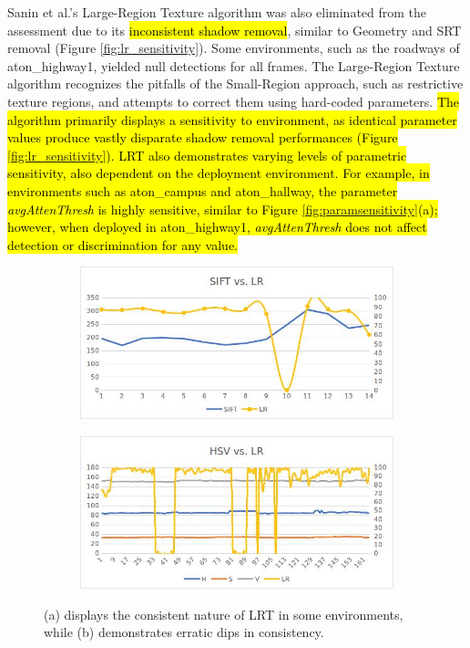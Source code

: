 \documentclass[12pt]{report}
\begin{document}
Sanin et al.'s Large-Region Texture algorithm was also eliminated from the assessment due to its \hl{inconsistent shadow removal}, similar to Geometry and SRT removal (Figure \ref{fig:lr_sensitivity}). Some environments, such as the roadways of aton\_highway1, yielded null detections for all frames. The Large-Region Texture algorithm recognizes the pitfalls of the Small-Region approach, such as restrictive texture regions, and attempts to correct them using hard-coded parameters. \hl{The algorithm primarily displays a sensitivity to environment, as identical parameter values produce vastly disparate shadow removal performances (Figure \ref{fig:lr_sensitivity}). LRT also demonstrates varying levels of parametric sensitivity, also dependent on the deployment environment. For example, in environments such as aton\_campus and aton\_hallway, the parameter \textit{avgAttenThresh} is highly sensitive, similar to Figure \ref{fig:paramsensitivity}(a); however, when deployed in aton\_highway1, \textit{avgAttenThresh} does not affect detection or discrimination for any value.}

\begin{figure}
\centering
\begin{subfigure}{.8\linewidth}
  \centering
  \includegraphics[width=1\linewidth]{figures/lrt_sensitivity_2.jpg}
  \caption{}
  \label{fig:sub1}
\end{subfigure}
\hfill
\begin{subfigure}{.8\linewidth}
  \centering
  \includegraphics[width=1\linewidth]{figures/lrt_sensitivity_1.jpg}
  \caption{}
  \label{fig:sub2}
\end{subfigure}
\caption{(a) displays the consistent nature of LRT in some environments, while (b) demonstrates erratic dips in consistency.}
\label{fig:lrt_sensitivity}
\end{figure}
\end{document}
